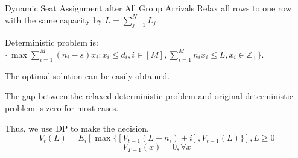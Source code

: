       \begin{frame}{Dynamic Seat Assignment after All Group Arrivals}
        Relax all rows to one row with the same capacity by $L = \sum_{j=1}^{N} L_j$.
        
        Deterministic problem is: $\{\max \sum_{i=1}^{M} (n_i- s) x_{i}: x_{i} \leq d_{i}, i \in [M], \sum_{i=1}^{M} n_{i} x_{i} \leq L, x_{i} \in \mathbb{Z}_{+}\}$.
        
        The optimal solution can be easily obtained. 

        The gap between the relaxed deterministic problem and original deterministic problem is zero for most cases. 

        Thus, we use DP to make the decision.
        $$V_{t}(L) = E_{i} [\max\{ {[V_{t-1}(L-n_i)+ i]}, {V_{t-1}(L)}\}], L \geq 0$$
        $$V_{T+1}(x) =0, \forall x$$
        

      \end{frame}
      